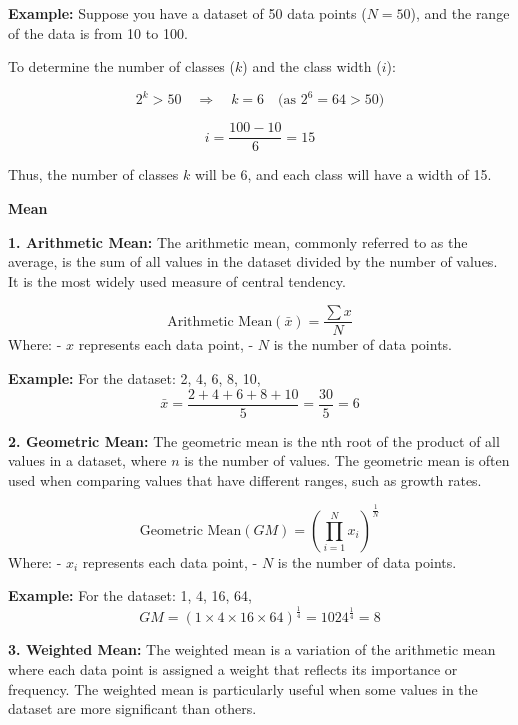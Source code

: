 \documentclass[12pt,a4paper]{book}
\begin{document}
\vspace{0.5cm}
\textbf{Example:}
Suppose you have a dataset of 50 data points (\(N = 50\)), and the range of the data is from 10 to 100.

To determine the number of classes (\(k\)) and the class width (\(i\)):

\[
2^k > 50 \quad \Rightarrow \quad k = 6 \quad \text{(as } 2^6 = 64 > 50\text{)}
\]

\[
i = \frac{100 - 10}{6} = 15
\]

Thus, the number of classes \(k\) will be 6, and each class will have a width of 15.

\vspace{1cm}

\textbf{Mean}

\vspace{0.5cm}

\textbf{1. Arithmetic Mean:}
The arithmetic mean, commonly referred to as the average, is the sum of all values in the dataset divided by the number of values. It is the most widely used measure of central tendency.

\[
\text{Arithmetic Mean} (\bar{x}) = \frac{\sum x}{N}
\]
Where:
- \(x\) represents each data point,
- \(N\) is the number of data points.

\textbf{Example:}
For the dataset: 2, 4, 6, 8, 10,
\[
\bar{x} = \frac{2 + 4 + 6 + 8 + 10}{5} = \frac{30}{5} = 6
\]

\vspace{0.5cm}

\textbf{2. Geometric Mean:}
The geometric mean is the nth root of the product of all values in a dataset, where \(n\) is the number of values. The geometric mean is often used when comparing values that have different ranges, such as growth rates.

\[
\text{Geometric Mean} (GM) = \left( \prod_{i=1}^{N} x_i \right)^{\frac{1}{N}}
\]
Where:
- \(x_i\) represents each data point,
- \(N\) is the number of data points.

\textbf{Example:}
For the dataset: 1, 4, 16, 64,
\[
GM = (1 \times 4 \times 16 \times 64)^{\frac{1}{4}} = 1024^{\frac{1}{4}} = 8
\]

\vspace{0.5cm}

\textbf{3. Weighted Mean:}
The weighted mean is a variation of the arithmetic mean where each data point is assigned a weight that reflects its importance or frequency. The weighted mean is particularly useful when some values in the dataset are more significant than others.
\end{document}
